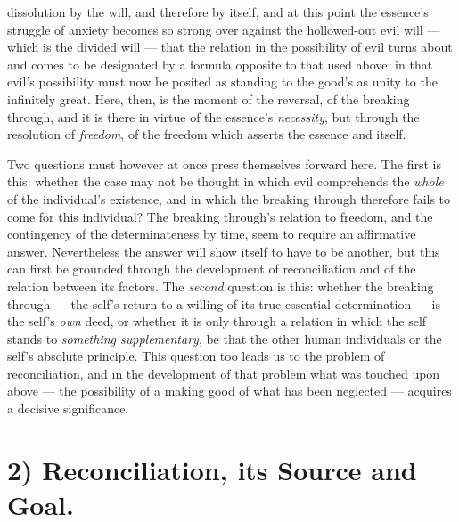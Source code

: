 \documentclass[12pt,a4paper]{book}
\begin{document}
dissolution by the will, and therefore by itself, and at this point the
essence's struggle of anxiety becomes so strong over against the hollowed-out
evil will --- which is the divided will --- that the relation in the
possibility of evil turns about and comes to be designated by a formula opposite to that used
above: in that evil's possibility must now be posited as standing to the good's
as unity to the infinitely great. Here, then, is the moment of the reversal, of
the breaking through, and it is there in virtue of the essence's
\emph{necessity}, but through the resolution of \emph{freedom}, of the freedom
which asserts the essence and itself.

Two questions must however at once press themselves forward here. The first is
this: whether the case may not be thought in which evil comprehends the
\emph{whole} of the individual's existence, and in which the breaking through
therefore fails to come for this individual? The breaking through's relation to
freedom, and the contingency of the determinateness by time, seem to require an
affirmative answer. Nevertheless the answer will show itself to have to be
another, but this can first be grounded through the development of
reconciliation and of the relation between its factors. The \emph{second}
question is this: whether the breaking through --- the self's return to a
willing of its true essential determination --- is the self's \emph{own} deed, or whether
it is only through a relation in which the self stands to \emph{something
supplementary}, be that the other human individuals or the self's absolute
principle. This question too leads us to the problem of reconciliation, and in
the development of that problem what was touched upon above --- the possibility
of a making good of what has been neglected --- acquires a decisive significance.

\section*{2) Reconciliation, its Source and Goal.}
\end{document}
